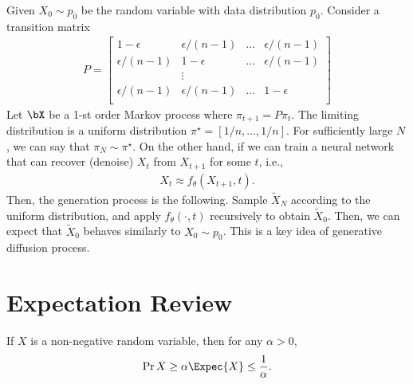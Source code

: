 \documentclass{article}
\begin{document}
\begin{example}
    Given $X_0\sim p_0$ be the random variable with data distribution $p_0$.
    Consider a transition matrix 
    \begin{align}
        P = \begin{bmatrix}
        1-\epsilon & \epsilon /(n-1)& \dots &\epsilon /(n-1)\\
        \epsilon/(n-1) & 1-\epsilon & \dots &\epsilon /(n-1)\\
        &\vdots&&\\
        \epsilon/(n-1) & \epsilon/(n-1)& \dots &1-\epsilon \\
       \end{bmatrix} 
    \end{align}
    Let $\bX$ be a 1-st order Markov process where $\pi_{t+1} = P \pi_t$.
    The limiting distribution is a uniform distribution $\pi^\star = [1/n, \dots, 1/n]$.
    For sufficiently large $N$, we can say that $\pi_N \sim \pi^\star$.
    On the other hand, if we can train a neural network that can recover (denoise) $X_t$ from $X_{t+1}$ for some $t$, i.e.,
    \begin{align}
        X_t \approx f_\theta(X_{t+1}, t).
    \end{align}
    Then, the generation process is the following.
    Sample $\tilde{X}_N$ according to the uniform distribution, and apply $f_{\theta}(\cdot, t)$ recursively to obtain $\tilde{X}_0$.
    Then, we can expect that $\tilde{X}_0$ behaves similarly to $X_0\sim p_0$.
    This is a key idea of generative diffusion process.
\end{example}



\newpage
\setcounter{section}{0}
\setcounter{theorem}{0}
\setcounter{equation}{0}


\section{Expectation Review}
\begin{theorem}
If $X$ is a non-negative random variable, then for any $\alpha > 0$,
\begin{align}
    \Pr{X\geq \alpha \Expec{X}} \leq \frac{1}{\alpha}.
\end{align}
\end{theorem}
\end{document}
